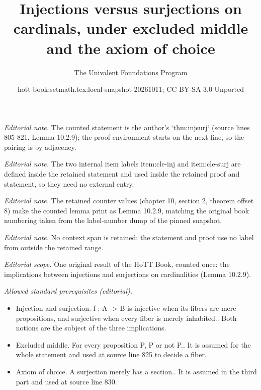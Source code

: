 \documentclass[10pt,a4paper]{article}
\title{Injections versus surjections on cardinals, under excluded middle and the axiom of choice}
\author{The Univalent Foundations Program}
\date{hott-book:setmath.tex:local-snapshot-20261011; CC BY-SA 3.0 Unported}
\newcounter{chapter}
\theoremstyle{definition}
\theoremstyle{remark}
\numberwithin{equation}{section}
\begin{document}
\maketitle
\setcounter{chapter}{10}
\setcounter{section}{2}
\setcounter{thm}{8}
\noindent\textit{Editorial note.} The counted statement is the author's `thm:injsurj` (source lines 805-821, Lemma 10.2.9); the proof environment starts on the next line, so the pairing is by adjacency.\par\medskip
\noindent\textit{Editorial note.} The two internal item labels item:cle-inj and item:cle-surj are defined inside the retained statement and used inside the retained proof and statement, so they need no external entry.\par\medskip
\noindent\textit{Editorial note.} The retained counter values (chapter 10, section 2, theorem offset 8) make the counted lemma print as Lemma 10.2.9, matching the original book numbering taken from the label-number dump of the pinned snapshot.\par\medskip
\noindent\textit{Editorial note.} No context span is retained: the statement and proof use no label from outside the retained range.\par\medskip
\noindent\textit{Editorial scope.} One original result of the HoTT Book, counted once: the implications between injections and surjections on cardinalities (Lemma 10.2.9).\par\medskip
\noindent\textit{Allowed standard prerequisites (editorial).}\begin{itemize}
\item Injection and surjection. f : A -> B is injective when its fibers are mere propositions, and surjective when every fiber is merely inhabited.. Both notions are the subject of the three implications.
\item Excluded middle. For every proposition P, P or not P.. It is assumed for the whole statement and used at source line 825 to decide a fiber.
\item Axiom of choice. A surjection merely has a section.. It is assumed in the third part and used at source line 830.
\end{itemize}\medskip
\end{document}
